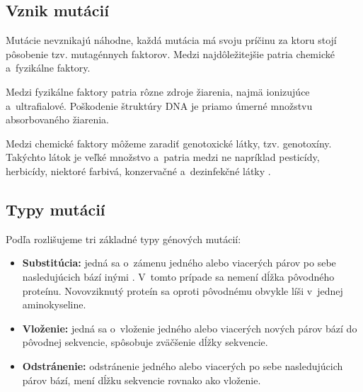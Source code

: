 \subsection{Vznik mutácií}

Mutácie nevznikajú náhodne, každá mutácia má svoju príčinu za ktoru stojí pôsobenie tzv. mutagénnych faktorov. Medzi najdôležitejšie patria chemické a~fyzikálne faktory.

Medzi fyzikálne faktory patria rôzne zdroje žiarenia, najmä ionizujúce a~ultrafialové. Poškodenie štruktúry DNA je priamo úmerné množstvu absorbovaného žiarenia.

Medzi chemické faktory môžeme zaradiť genotoxické látky, tzv. genotoxíny. Takýchto látok je veľké množstvo a~patria medzi ne napríklad pesticídy, herbicídy, niektoré farbivá, konzervačné a~dezinfekčné látky \cite{mutace}. 

\subsection{Typy mutácií}

Podľa \cite{flegr} rozlišujeme tri základné typy génových mutácií:
\begin{itemize}
	\item \textbf{Substitúcia:} jedná sa o~zámenu jedného alebo viacerých párov po sebe nasledujúcich bází inými \cite{mutace}. V~tomto prípade sa nemení dĺžka pôvodného proteínu. Novovziknutý proteín sa oproti pôvodnému obvykle líši v~jednej aminokyseline.
	\item \textbf{Vloženie:} jedná sa o~vloženie jedného alebo viacerých nových párov bází do pôvodnej sekvencie, spôsobuje zväčšenie dĺžky sekvencie.
	\item \textbf{Odstránenie:} odstránenie jedného alebo viacerých po sebe nasledujúcich párov bází, mení dĺžku sekvencie rovnako ako vloženie.
\end{itemize}

